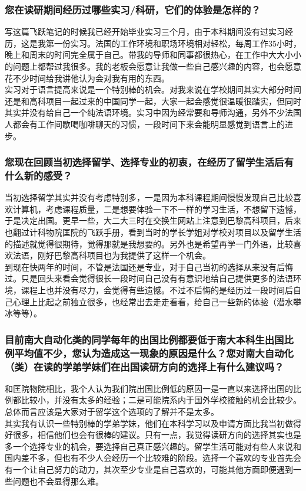 \documentclass[a4paper,UTF8]{book}
\begin{document}
    \subsubsection*{您在读研期间经历过哪些实习/科研，它们的体验是怎样的？}
    写这篇飞跃笔记的时候我已经开始毕业实习三个月，由于本科期间没有过实习经历，这是我第一份实习。法国的工作环境和职场环境相对轻松，每周工作35小时，晚上和周末的时间完全属于自己。带我的导师和同事都很热心，在工作中大大小小的问题上都帮过我很多。我的老板会愿意让我做一些自己感兴趣的内容，也会愿意花不少时间给我讲他认为会对我有用的东西。\\
    实习对于语言提高来说是一个特别棒的机会。对我来说在学校期间其实大部分时间还是和高科项目一起过来的中国同学一起，大家一起会感觉很温暖很踏实，但同时其实并没有给自己一个纯法语环境。实习中因为经常要和导师沟通，另外不少法国人都会有工作间歇喝咖啡聊天的习惯，一段时间下来会能明显感觉到语言上的进步。
    
    \subsubsection*{您现在回顾当初选择留学、选择专业的初衷，在经历了留学生活后有什么新的感受？}
    当初选择留学其实并没有考虑特别多，一是因为本科课程期间慢慢发现自己比较喜欢计算机，考虑课程质量，二是想要体验一下不一样的学习生活，不想留下遗憾，于是决定出国。更早一些，大二大三时在交换生网站上注意到巴黎高科项目，后来也翻过计科物院匡院的飞跃手册，看到当时的学长学姐对学校对项目以及留学生活的描述就觉得很期待，觉得那就是我想要的。另外也是希望再学一门外语，比较喜欢法语，刚好巴黎高科项目也为我提供了这样一个机会。\\
    到现在快两年的时间，不管是法国还是专业，对于自己当初的选择从来没有后悔过。只是回头来看会觉得很长一段时间自己没有有意识地给自己提供更多的法语环境，课程上也并没有尽力，会觉得有些遗憾。不过不后悔的是经历过一段时间后自己心理上比起之前独立很多，也经常出去走走看看，给自己一些新的体验（潜水攀冰等等）。

    \subsubsection*{目前南大自动化类的同学每年的出国比例都要低于南大本科生出国比例平均值不少，您认为造成这一现象的原因是什么？您对南大自动化（类）在读的学弟学妹们在出国读研方向的选择上有什么建议吗？}
    和匡院物院相比，我个人认为我们院出国比例低的原因一是一直以来选择出国的比例都比较小，并没有太多的经验；二是可能院系内于国外学校接触的机会比较少。总体而言应该是大家对于留学这个选项的了解并不是太多。\\
    其实我有认识一些特别棒的学弟学妹，他们在本科学习以及申请方面比我当初做得好很多，相信他们也会有很棒的建议。只有一点，我觉得读研方向的选择其实也是多一个选择专业的机会，要选择自己真正感兴趣的。留学生活可能对有些人来说和国内差不多，但也有不少人会经历一个比较难的阶段。选择一个喜欢的专业首先会有一个让自己努力的动力，其次至少专业是自己喜欢的，可能其他方面即便遇到一些问题也不会显得那么难。
    
\end{document}
